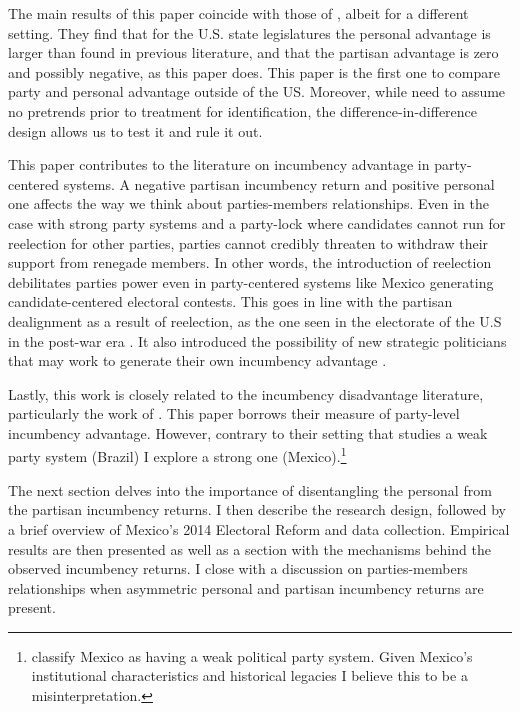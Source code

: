 \documentclass[12pt]{amsart}
\numberwithin{equation}{section}
\theoremstyle{definition}
\theoremstyle{definition}
\theoremstyle{definition}
\begin{document}
The main results of this paper coincide with those of \citep{fowler_hall_2014}, albeit for a different setting. They find that for the U.S. state legislatures the personal advantage is larger than found in previous literature, and that the partisan advantage is zero and possibly negative, as this paper does. This paper is the first one to compare party and personal advantage outside of the US. Moreover, while \citet{fowler_hall_2014} need to assume no pretrends prior to treatment for identification, the difference-in-difference design allows us to test it and rule it out. 

This paper contributes to the literature on incumbency advantage in party-centered systems. A negative partisan incumbency return and positive personal one affects the way we think about parties-members relationships. Even in the case with strong party systems and a party-lock where candidates cannot run for reelection for other parties, parties cannot credibly threaten to withdraw their support from renegade members. In other words, the introduction of reelection debilitates parties power even in party-centered systems like Mexico generating candidate-centered electoral contests. This goes in line with the partisan dealignment as a result of reelection, as the one seen in the electorate of the U.S in the post-war era  \citep{cox_katz_1996}. It also introduced the possibility of new strategic politicians that may work to generate their own incumbency advantage  \citep{mayhew_1974, mckelvey_riezman_1992}.  
 
     
Lastly, this work is closely related to the incumbency disadvantage literature, particularly the work of \citet{klasnja_titiunik_2017}. This paper borrows their measure of party-level incumbency advantage. However, contrary to their setting that studies a weak party system (Brazil) I explore a strong one (Mexico).\footnote{\citet{klasnja_titiunik_2017} classify Mexico as having a weak political party system. Given Mexico's institutional characteristics and historical legacies I believe this to be a misinterpretation.}

The next section delves into the importance of disentangling the personal from the partisan incumbency returns. I then describe the research design, followed by a brief overview of Mexico's 2014 Electoral Reform and data collection. Empirical results are then presented as well as a section with the mechanisms behind the observed incumbency returns. I close with a discussion on parties-members relationships when asymmetric personal and partisan incumbency returns are present. 
\end{document}
